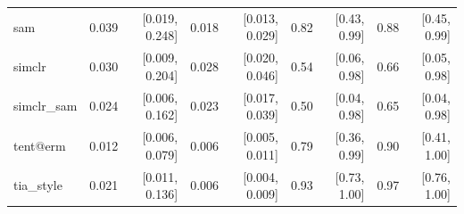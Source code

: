 \begin{tabular}{lrrrrrrrr}
sam & 0.039 & [0.019, 0.248] & 0.018 & [0.013, 0.029] & 0.82 & [0.43, 0.99] & 0.88 & [0.45, 0.99] \\
simclr & 0.030 & [0.009, 0.204] & 0.028 & [0.020, 0.046] & 0.54 & [0.06, 0.98] & 0.66 & [0.05, 0.98] \\
simclr\_sam & 0.024 & [0.006, 0.162] & 0.023 & [0.017, 0.039] & 0.50 & [0.04, 0.98] & 0.65 & [0.04, 0.98] \\
tent@erm & 0.012 & [0.006, 0.079] & 0.006 & [0.005, 0.011] & 0.79 & [0.36, 0.99] & 0.90 & [0.41, 1.00] \\
tia\_style & 0.021 & [0.011, 0.136] & 0.006 & [0.004, 0.009] & 0.93 & [0.73, 1.00] & 0.97 & [0.76, 1.00] \\
\bottomrule
\end{tabular}
